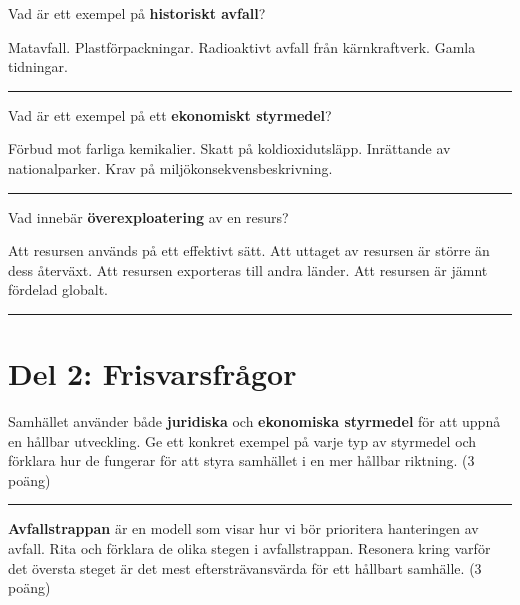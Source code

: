 \documentclass{exam}
\begin{document}
\begin{questions}
\question Vad är ett exempel på \textbf{historiskt avfall}?
\vspace{2mm}
\begin{checkboxes}
    \choice Matavfall.
    \choice Plastförpackningar.
    \choice Radioaktivt avfall från kärnkraftverk.
    \choice Gamla tidningar.
\end{checkboxes}
\vspace{5mm} \hrule \vspace{5mm}
\break
\question Vad är ett exempel på ett \textbf{ekonomiskt styrmedel}?
\vspace{2mm}
\begin{checkboxes}
    \choice Förbud mot farliga kemikalier.
    \choice Skatt på koldioxidutsläpp.
    \choice Inrättande av nationalparker.
    \choice Krav på miljökonsekvensbeskrivning.
\end{checkboxes}
\vspace{5mm} \hrule \vspace{5mm}

\question Vad innebär \textbf{överexploatering} av en resurs?
\vspace{2mm}
\begin{checkboxes}
    \choice Att resursen används på ett effektivt sätt.
    \choice Att uttaget av resursen är större än dess återväxt.
    \choice Att resursen exporteras till andra länder.
    \choice Att resursen är jämnt fördelad globalt.
\end{checkboxes}
\vspace{5mm} \hrule \vspace{5mm}

\break

\section*{Del 2: Frisvarsfrågor}

\question Samhället använder både \textbf{juridiska} och \textbf{ekonomiska styrmedel} för att uppnå en hållbar utveckling. Ge ett konkret exempel på varje typ av styrmedel och förklara hur de fungerar för att styra samhället i en mer hållbar riktning. (3 poäng)

\vspace{80mm} 
\hrule 
\vspace{5mm}

\question \textbf{Avfallstrappan} är en modell som visar hur vi bör prioritera hanteringen av avfall. Rita och förklara de olika stegen i avfallstrappan. Resonera kring varför det översta steget är det mest eftersträvansvärda för ett hållbart samhälle. (3 poäng)



\end{questions}
\end{document}
